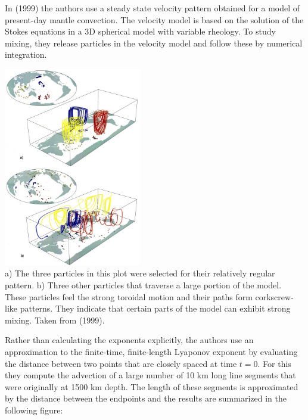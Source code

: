 In \textcite{vazh99} (1999) the authors use a steady state velocity
pattern obtained for a model of present-day mantle convection. The velocity model is
based on the solution of the Stokes equations in a 3D spherical model with variable rheology.
To study mixing, they release particles in the velocity model and follow 
these by numerical integration. 

\begin{center}
\includegraphics[width=6cm]{images/mixing/vazh99}\\
{\captionfont a) The three particles in this plot were
selected for their relatively regular pattern. 
b) Three other particles that traverse a large portion of the model. These particles feel 
the strong toroidal motion and their paths form corkscrew-like patterns. 
They indicate that certain parts of the model can exhibit strong mixing. 
Taken from \textcite{vazh99} (1999).}
\end{center}

Rather than calculating the exponents explicitly, the authors 
use an approximation to the finite-time,
finite-length Lyaponov exponent by evaluating the distance between two points that are closely spaced
at time $t=0$. For this they compute the advection of a
large number of 10 km long line segments that were
originally at 1500 km depth. The length of these segments is approximated by the distance between the
endpoints and the results are summarized in the following figure:

